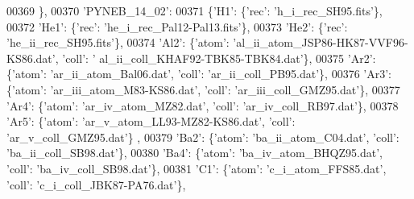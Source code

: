 \begin{DoxyCode}
00369                              \},
00370                            \textcolor{stringliteral}{'PYNEB\_14\_02'}:
00371                             \{\textcolor{stringliteral}{'H1'}: \{\textcolor{stringliteral}{'rec'}: \textcolor{stringliteral}{'h\_i\_rec\_SH95.fits'}\},
00372                              \textcolor{stringliteral}{'He1'}: \{\textcolor{stringliteral}{'rec'}: \textcolor{stringliteral}{'he\_i\_rec\_Pal12-Pal13.fits'}\},
00373                              \textcolor{stringliteral}{'He2'}: \{\textcolor{stringliteral}{'rec'}: \textcolor{stringliteral}{'he\_ii\_rec\_SH95.fits'}\},
00374                              \textcolor{stringliteral}{'Al2'}: \{\textcolor{stringliteral}{'atom'}: \textcolor{stringliteral}{'al\_ii\_atom\_JSP86-HK87-VVF96-KS86.dat'}, \textcolor{stringliteral}{'coll'}: \textcolor{stringliteral}{'
      al\_ii\_coll\_KHAF92-TBK85-TBK84.dat'}\},
00375                              \textcolor{stringliteral}{'Ar2'}: \{\textcolor{stringliteral}{'atom'}: \textcolor{stringliteral}{'ar\_ii\_atom\_Bal06.dat'}, \textcolor{stringliteral}{'coll'}: \textcolor{stringliteral}{'ar\_ii\_coll\_PB95.dat'}\},
00376                              \textcolor{stringliteral}{'Ar3'}: \{\textcolor{stringliteral}{'atom'}: \textcolor{stringliteral}{'ar\_iii\_atom\_M83-KS86.dat'}, \textcolor{stringliteral}{'coll'}: \textcolor{stringliteral}{'ar\_iii\_coll\_GMZ95.dat'}\},
00377                              \textcolor{stringliteral}{'Ar4'}: \{\textcolor{stringliteral}{'atom'}: \textcolor{stringliteral}{'ar\_iv\_atom\_MZ82.dat'}, \textcolor{stringliteral}{'coll'}: \textcolor{stringliteral}{'ar\_iv\_coll\_RB97.dat'}\},
00378                              \textcolor{stringliteral}{'Ar5'}: \{\textcolor{stringliteral}{'atom'}: \textcolor{stringliteral}{'ar\_v\_atom\_LL93-MZ82-KS86.dat'}, \textcolor{stringliteral}{'coll'}: \textcolor{stringliteral}{'ar\_v\_coll\_GMZ95.dat'}\}
      ,
00379                              \textcolor{stringliteral}{'Ba2'}: \{\textcolor{stringliteral}{'atom'}: \textcolor{stringliteral}{'ba\_ii\_atom\_C04.dat'}, \textcolor{stringliteral}{'coll'}: \textcolor{stringliteral}{'ba\_ii\_coll\_SB98.dat'}\},
00380                              \textcolor{stringliteral}{'Ba4'}: \{\textcolor{stringliteral}{'atom'}: \textcolor{stringliteral}{'ba\_iv\_atom\_BHQZ95.dat'}, \textcolor{stringliteral}{'coll'}: \textcolor{stringliteral}{'ba\_iv\_coll\_SB98.dat'}\},
00381                              \textcolor{stringliteral}{'C1'}: \{\textcolor{stringliteral}{'atom'}: \textcolor{stringliteral}{'c\_i\_atom\_FFS85.dat'}, \textcolor{stringliteral}{'coll'}: \textcolor{stringliteral}{'c\_i\_coll\_JBK87-PA76.dat'}\},

\end{DoxyCode}
